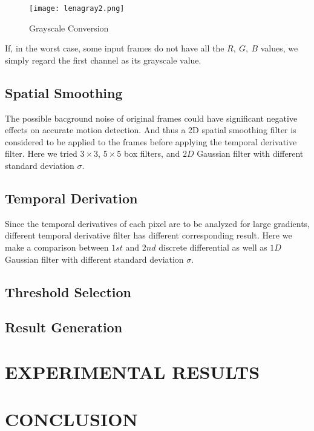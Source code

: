 \documentclass[letterpaper, 10 pt, conference]{ieeeconf}
\begin{document}
\begin{figure}[thpb]
\centering
\texttt{[image: lenagray2.png]}
\caption{Grayscale Conversion}
\label{gray}
\end{figure}
If, in the worst case, some input frames do not have all the $R,\ G,\ B$ values, we simply regard the first channel as its grayscale value.

\subsection{Spatial Smoothing}
The possible bacground noise of original frames could have significant negative effects on accurate motion detection. And thus a 2D spatial smoothing filter is considered to be applied to the frames before applying the temporal derivative filter. Here we tried $3\times3$, $5\times5$ box filters, and $2D$ Gaussian filter with different standard deviation $\sigma$.

\subsection{Temporal Derivation} 
Since the temporal derivatives of each pixel are to be analyzed for large gradients, different temporal derivative filter has different corresponding result. Here we make a comparison between $1st$ and $2nd$ discrete differential as well as $1D$ Gaussian filter with different standard deviation $\sigma$.

\subsection{Threshold Selection}


\subsection{Result Generation}



\section{EXPERIMENTAL RESULTS}


\section{CONCLUSION}
\end{document}
